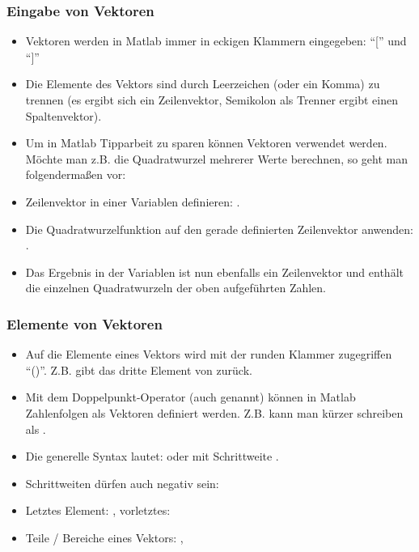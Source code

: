     \begin{frame}
      \frametitle{Eingabe von Vektoren}

      \vspace{-0.5cm}

      \begin{itemize}
          \item Vektoren werden in Matlab immer in eckigen Klammern eingegeben: ``['' und ``]''
          \item Die Elemente des Vektors sind durch Leerzeichen (oder ein Komma) zu trennen
          (es ergibt sich ein Zeilenvektor, Semikolon als Trenner ergibt einen Spaltenvektor).
          \item Um in Matlab Tipparbeit zu sparen können Vektoren verwendet werden.
          Möchte man z.B. die Quadratwurzel mehrerer Werte berechnen, so geht man folgendermaßen vor:
          \item Zeilenvektor in einer Variablen definieren: .
          \item Die Quadratwurzelfunktion auf den gerade definierten Zeilenvektor  anwenden: .
          \item Das Ergebnis in der Variablen  ist nun ebenfalls ein Zeilenvektor und enthält die einzelnen
          Quadratwurzeln der oben aufgeführten Zahlen.
      \end{itemize}
    \end{frame}

    \begin{frame}
      \frametitle{Elemente von Vektoren}
      \begin{itemize}
          \item Auf die Elemente eines Vektors wird mit der runden Klammer zugegriffen ``()''. Z.B. 
          gibt das dritte Element von  zurück.
          \item Mit dem Doppelpunkt-Operator \matlabInput{:} (auch  genannt) können in Matlab Zahlenfolgen als Vektoren definiert werden. Z.B. kann man
           kürzer schreiben als .
          \item Die generelle Syntax lautet:  oder  mit Schrittweite .
          \item Schrittweiten dürfen auch negativ sein: 
          \item Letztes Element: , vorletztes: 
          \item Teile / Bereiche eines Vektors: , 
      \end{itemize}
    \end{frame}

